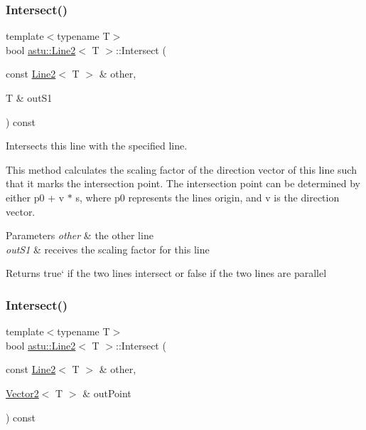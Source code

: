 \subsubsection{\texorpdfstring{Intersect()}{Intersect()}\hspace{0.1cm}{\footnotesize\ttfamily [2/3]}}
{\footnotesize\ttfamily template$<$typename T$>$ \\
bool \hyperlink{classastu_1_1Line2}{astu\+::\+Line2}$<$ T $>$\+::Intersect (\begin{DoxyParamCaption}\item[{const \hyperlink{classastu_1_1Line2}{Line2}$<$ T $>$ \&}]{other,  }\item[{T \&}]{out\+S1 }\end{DoxyParamCaption}) const\hspace{0.3cm}{\ttfamily [inline]}}

Intersects this line with the specified line.

This method calculates the scaling factor of the direction vector of this line such that it marks the intersection point. The intersection point can be determined by either p0 + v $\ast$ s, where p0 represents the line\textquotesingle{}s origin, and v is the direction vector.


\begin{DoxyParams}{Parameters}
{\em other} & the other line \\
\hline
{\em out\+S1} & receives the scaling factor for this line \\
\hline
\end{DoxyParams}
\begin{DoxyReturn}{Returns}
\textquotesingle{}true` if the two lines intersect or false if the two lines are parallel 
\end{DoxyReturn}
\mbox{\label{classastu_1_1Line2_a1d16a1e232138e321cec8165baa0acad}} 
\subsubsection{\texorpdfstring{Intersect()}{Intersect()}\hspace{0.1cm}{\footnotesize\ttfamily [3/3]}}
{\footnotesize\ttfamily template$<$typename T$>$ \\
bool \hyperlink{classastu_1_1Line2}{astu\+::\+Line2}$<$ T $>$\+::Intersect (\begin{DoxyParamCaption}\item[{const \hyperlink{classastu_1_1Line2}{Line2}$<$ T $>$ \&}]{other,  }\item[{\hyperlink{classastu_1_1Vector2}{Vector2}$<$ T $>$ \&}]{out\+Point }\end{DoxyParamCaption}) const\hspace{0.3cm}{\ttfamily [inline]}}

